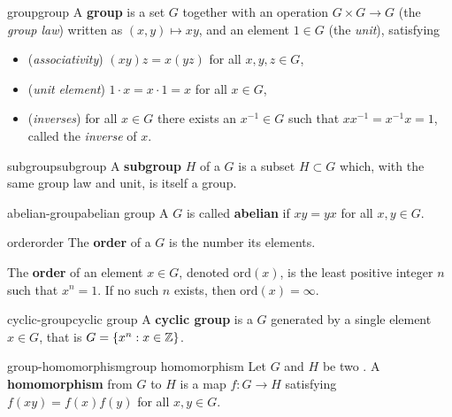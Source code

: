 \begin{topic}{group}{group}
    A \textbf{group} is a set $G$ together with an operation $G \times G \to G$ (the \textit{group law}) written as $(x, y) \mapsto xy$, and an element $1 \in G$ (the \textit{unit}), satisfying
    \begin{itemize}
        \item (\textit{associativity}) $(xy)z = x(yz)$ for all $x, y, z \in G$,
        \item (\textit{unit element}) $1 \cdot x = x \cdot 1 = x$ for all $x \in G$,
        \item (\textit{inverses}) for all $x \in G$ there exists an $x^{-1} \in G$ such that $x x^{-1} = x^{-1} x = 1$, called the \textit{inverse} of $x$.
    \end{itemize}
\end{topic}

\begin{topic}{subgroup}{subgroup}
    A \textbf{subgroup} $H$ of a  $G$ is a subset $H \subset G$ which, with the same group law and unit, is itself a group.
\end{topic}

\begin{topic}{abelian-group}{abelian group}
    A  $G$ is called \textbf{abelian} if $xy = yx$ for all $x, y \in G$.
\end{topic}

\begin{topic}{order}{order}
    The \textbf{order} of a  $G$ is the number its elements.
    
    The \textbf{order} of an element $x \in G$, denoted $\text{ord}(x)$, is the least positive integer $n$ such that $x^n = 1$. If no such $n$ exists, then $\text{ord}(x) = \infty$.
\end{topic}

\begin{topic}{cyclic-group}{cyclic group}
    A \textbf{cyclic group} is a  $G$ generated by a single element $x \in G$, that is $G = \{ x^n : x \in \mathbb{Z} \}$.
\end{topic}

\begin{topic}{group-homomorphism}{group homomorphism}
    Let $G$ and $H$ be two . A \textbf{homomorphism} from $G$ to $H$ is a map $f : G \to H$ satisfying $f(xy) = f(x) f(y)$ for all $x, y \in G$.
\end{topic}

